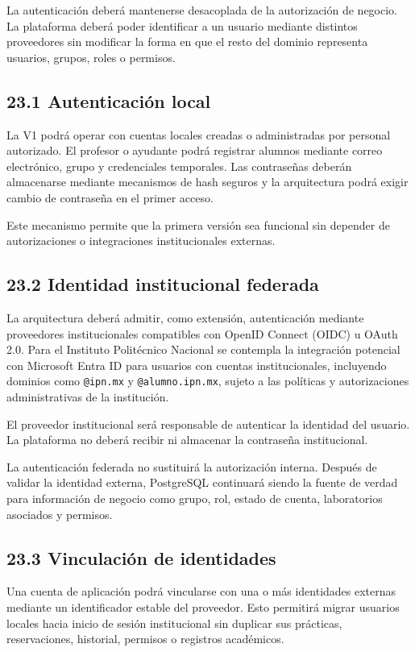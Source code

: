 \documentclass[12pt]{article}
\begin{document}
La autenticación deberá mantenerse desacoplada de la autorización de negocio. La plataforma deberá poder identificar a un usuario mediante distintos proveedores sin modificar la forma en que el resto del dominio representa usuarios, grupos, roles o permisos.

\subsection*{23.1 Autenticación local}

La V1 podrá operar con cuentas locales creadas o administradas por personal autorizado. El profesor o ayudante podrá registrar alumnos mediante correo electrónico, grupo y credenciales temporales. Las contraseñas deberán almacenarse mediante mecanismos de hash seguros y la arquitectura podrá exigir cambio de contraseña en el primer acceso.

Este mecanismo permite que la primera versión sea funcional sin depender de autorizaciones o integraciones institucionales externas.

\subsection*{23.2 Identidad institucional federada}

La arquitectura deberá admitir, como extensión, autenticación mediante proveedores institucionales compatibles con OpenID Connect (OIDC) u OAuth 2.0. Para el Instituto Politécnico Nacional se contempla la integración potencial con Microsoft Entra ID para usuarios con cuentas institucionales, incluyendo dominios como \texttt{@ipn.mx} y \texttt{@alumno.ipn.mx}, sujeto a las políticas y autorizaciones administrativas de la institución.

El proveedor institucional será responsable de autenticar la identidad del usuario. La plataforma no deberá recibir ni almacenar la contraseña institucional.

La autenticación federada no sustituirá la autorización interna. Después de validar la identidad externa, PostgreSQL continuará siendo la fuente de verdad para información de negocio como grupo, rol, estado de cuenta, laboratorios asociados y permisos.

\subsection*{23.3 Vinculación de identidades}

Una cuenta de aplicación podrá vincularse con una o más identidades externas mediante un identificador estable del proveedor. Esto permitirá migrar usuarios locales hacia inicio de sesión institucional sin duplicar sus prácticas, reservaciones, historial, permisos o registros académicos.
\end{document}

